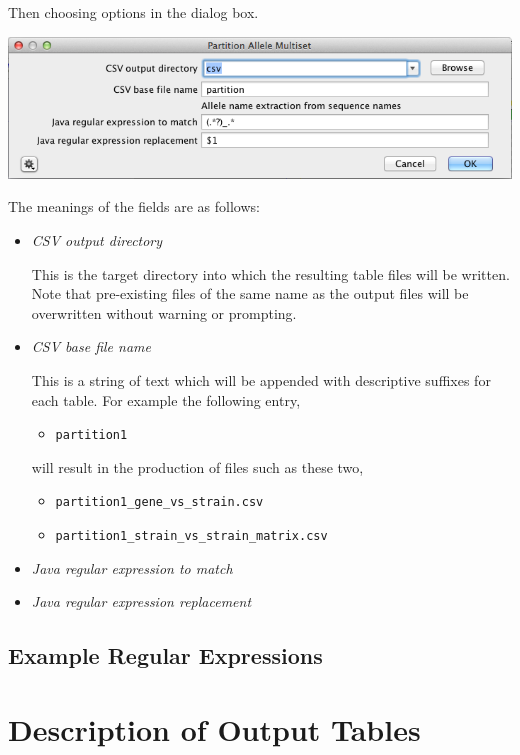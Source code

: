 \documentclass[12pt,letterpaper]{article}
\begin{document}
\hfill

Then choosing options in the dialog box.

\hfill

\includegraphics[resolution=130]{dialog_box.png}

\hfill

The meanings of the fields are as follows:

\begin{itemize}
\item \textit{CSV output directory} \hfill \\
    This is the target directory into which the resulting table files will be
    written.  Note that pre-existing files of the same name as the output files
    will be overwritten without warning or prompting.

\item \textit{CSV base file name} \hfill \\
    This is a string of text which will be appended with descriptive suffixes
    for each table.  For example the following entry,
    
    \begin{itemize}
    \item[]\texttt{partition1}
    \end{itemize}

    will result in the production of files such as these two,

    \begin{itemize}
    \item[]\texttt{partition1\_gene\_vs\_strain.csv}
    \item[]\texttt{partition1\_strain\_vs\_strain\_matrix.csv}
    \end{itemize}

\item \textit{Java regular expression to match} \hfill \\

\item \textit{Java regular expression replacement} \hfill \\

\end{itemize}

\subsection{Example Regular Expressions}

\section{Description of Output Tables}
\end{document}

